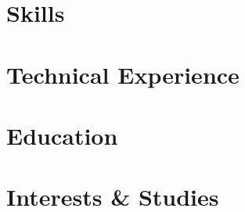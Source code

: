 \documentclass[letter,14pt]{article}
\begin{document}
\section{Skills}


\section{Technical Experience}


\section{Education}


\section{Interests \& Studies}

\end{document}
